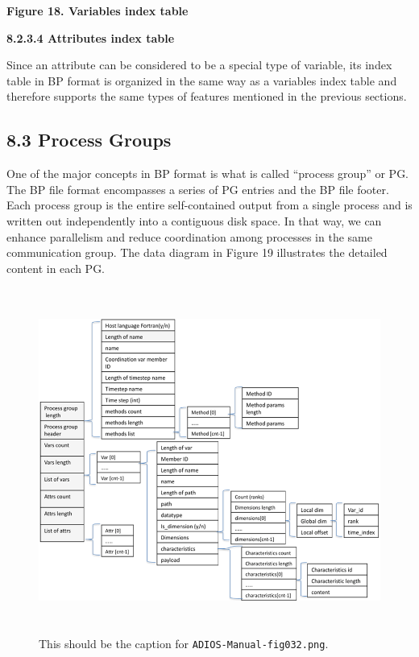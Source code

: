 \vspace{22pt}
\begin{center}
{\color{color20} \textbf{Figure 18. Variables index table}}
\end{center}

\vspace{10pt}
\textbf{8.2.3.4 Attributes index table}

\vspace{10pt}
Since an attribute can be considered to be a special type of variable, its index 
table in BP format is organized in the same way as a variables index table and 
therefore supports the same types of features mentioned in the previous sections. 
\label{HToc84890274}\label{HToc212016650}\label{HToc212016892}\label{HToc182553421}

\vspace{10pt}
\subsection*{{\large 8.3 }{\large \textbf{Process Groups}}}

\vspace{10pt}
One of the major concepts in BP format is what is called ``process group'' or PG. 
The BP file format encompasses a series of PG entries and the BP file footer. Each 
process group is the entire self-contained output from a single process and is 
written out independently into a contiguous disk space. In that way, we can enhance 
parallelism and reduce coordination among processes in the same communication group. 
The data diagram in Figure 19 illustrates the detailed content in each PG. 

\begin{figure}[htbp]
\begin{center}
\includegraphics[width=389pt, height=321pt]{ADIOS-Manual-fig032.png}
\caption{This should be the caption for \texttt{ADIOS-Manual-fig032.png}.}
\end{center}
\end{figure}\label{HRef119578960}\label{HToc144350178}

